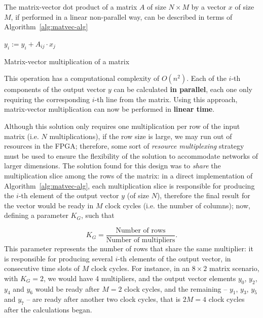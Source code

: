 \documentclass{IEEEtran}
\begin{document}
The matrix-vector dot product of a matrix $A$ of size $N \times M$ by a vector $x$ of size $M$, if performed in a linear non-parallel way, can be described in terms of Algorithm~\ref{alg:matvec-alg}

\begin{algorithm}
\begin{algorithmic}
    \State $y_i := y_i + A_{ij} \cdot x_j$
    \EndFor
\EndFor
\end{algorithmic}
\caption{Matrix-vector multiplication of a matrix}
\label{alg:matvec-alg}
\end{algorithm}
This operation has a computational complexity of $O(n^2)$. Each of the $i$-th components of the output vector $y$ can be calculated \textbf{in parallel},
each one only requiring the corresponding $i$-th line from the matrix. Using this approach, matrix-vector multiplication can now be performed in \textbf{linear time}.

Although this solution only requires one multiplication per row of the input matrix (i.e. $N$ multiplications), if the row
size is large, we may run out of resources in the FPGA; therefore, some sort of \textit{resource multiplexing} strategy must
be used to ensure the flexibility of the solution to accommodate networks of larger dimensions. The solution found for this
design was to \emph{share} the multiplication slice among the rows of the matrix: in a direct implementation of Algorithm~\ref{alg:matvec-alg},
each multiplication slice is responsible for producing the $i$-th element of the output vector $y$ (of size $N$), therefore the final
result for the vector would be ready in $M$ clock cycles (i.e. the number of columns); now, defining a
parameter $K_G$, such that

\begin{equation}\label{eq:kg}
K_G = \frac{\text{Number of rows}}{\text{Number of multipliers}}.
\end{equation}
This parameter represents the number of rows that share the same multiplier: it is responsible for producing several $i$-th elements of the output vector, in consecutive time slots of $M$ clock cycles.
For instance, in an $8\times2$ matrix scenario, with $K_G = 2$, we would have 4 multipliers, and the output vector
elements $y_0$, $y_2$, $y_4$ and $y_6$ would be ready after $M=2$ clock cycles, and the remaining -- $y_1$, $y_3$, $y_5$ and $y_7$ --  are
ready after another two clock cycles, that is $2M = 4$ clock cycles after the calculations began.
\end{document}
